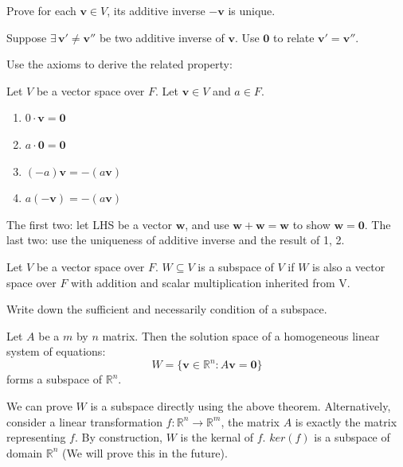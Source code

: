 \documentclass[12pt]{article}
\begin{document}
\begin{exercise}
    Prove for each $\mathbf{v}\in V$, its additive inverse $-\mathbf{v}$ is unique.
\end{exercise}
\begin{pfbox}
Suppose $\exists\,\mathbf{v'}\neq \mathbf{v''}$ be two additive inverse of $\mathbf{v}.$
Use $\mathbf{0}$ to relate $\mathbf{v'}=\mathbf{v''}.$
\end{pfbox}


Use the axioms to derive the related property:
\begin{property}
Let $V$ be a vector space over $F$. Let $\mathbf{v}\in V$ and $a\in F$.
\begin{enumerate}
    \item $0\cdot\mathbf{v}=\mathbf{0}$
    \item $a\cdot\mathbf{0}=\mathbf{0}$
    \item $(-a)\mathbf{v} = -(a\mathbf{v})$
    \item $a(-\mathbf{v}) = -(a\mathbf{v})$
\end{enumerate}
\end{property}

\begin{pfbox}
    The first two: let LHS be a vector $\mathbf{w}$, and use $\mathbf{w}+\mathbf{w}=\mathbf{w}$ to show $\mathbf{w}=\mathbf{0}.$
    The last two: use the uniqueness of additive inverse and the result of 1, 2.
\end{pfbox}


\begin{definition}
Let $V$ be a vector space over $F$. $W\subseteq V$ is a subspace of $V$ if $W$ is also a vector space over $F$ with addition and scalar multiplication inherited from V.
\end{definition}

\begin{exercise}
    Write down the sufficient and necessarily condition of a subspace.
\end{exercise}

\begin{theorem}
    Let $A$ be a $m$ by $n$ matrix. Then the solution space of a homogeneous linear system of equations:
    \[W=\{\mathbf{v}\in \mathbb{R}^n: A\mathbf{v}=\mathbf{0}\}\]
    forms a subspace of $\mathbb{R}^n$.
\end{theorem}

\begin{pfbox}
    We can prove $W$ is a subspace directly using the above theorem.
    Alternatively, consider a linear transformation $f: \mathbb{R}^n\rightarrow\mathbb{R}^m$, the matrix $A$ is exactly the matrix representing $f$.
    By construction, $W$ is the kernal of $f$. $ker(f)$ is a subspace of domain $\mathbb{R}^n$ (We will prove this in the future).
\end{pfbox}
\end{document}
